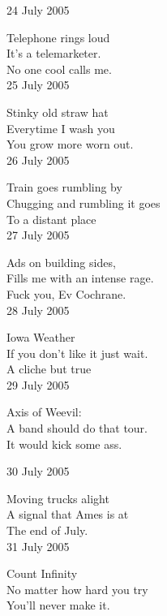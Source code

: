 \documentclass[12pt]{article}
\begin{document}
\newpage

24 July 2005

Telephone rings loud \\
It's a telemarketer. \\
No one cool calls me. \\

25 July 2005

Stinky old straw hat \\
Everytime I wash you \\
You grow more worn out. \\

26 July 2005

Train goes rumbling by \\
Chugging and rumbling it goes \\
To a distant place \\

27 July 2005

Ads on building sides, \\
Fills me with an intense rage. \\
Fuck you, Ev Cochrane. \\

28 July 2005

Iowa Weather \\
If you don't like it just wait. \\
A cliche but true \\

29 July 2005

Axis of Weevil: \\
A band should do that tour. \\
It would kick some ass. \\

\newpage


30 July 2005

Moving trucks alight \\
A signal that Ames is at \\
The end of July. \\

31 July 2005

Count Infinity \\
No matter how hard you try \\
You'll never make it. \\

\newpage
\end{document}

